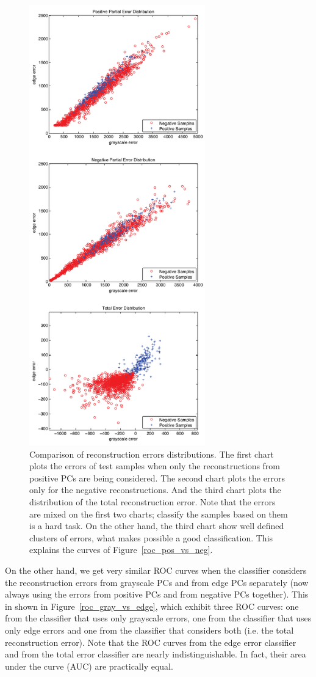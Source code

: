 \documentclass[10pt, conference, compsocconf]{IEEEtran}
\begin{document}
\begin{figure}[t!]
\centering
\includegraphics[width=3in]{dist_pos_vs_neg}
\caption{Comparison of reconstruction errors distributions. The first chart plots the errors of test samples when only the reconstructions from positive PCs are being considered. The second chart plots the errors only for the negative reconstructions. And the third chart plots the distribution of the total reconstruction error. Note that the errors are mixed on the first two charts; classify the samples based on them is a hard task. On the other hand, the third chart show well defined clusters of errors, what makes possible a good classification. This explains the curves of Figure~\ref{roc_pos_vs_neg}.}
\label{dist_pos_vs_neg}
\end{figure}

On the other hand, we get very similar ROC curves when the classifier considers the reconstruction errors from grayscale PCs and from edge PCs separately (now always using the errors from positive PCs and from negative PCs together). This in shown in Figure~\ref{roc_gray_vs_edge}, which exhibit three ROC curves: one from the classifier that uses only grayscale errors, one from the classifier that uses only edge errors and one from the classifier that considers both (i.e. the total reconstruction error). Note that the ROC curves from the edge error classifier and from the total error classifier are nearly indistinguishable. In fact, their area under the curve (AUC) are practically equal.
\end{document}
